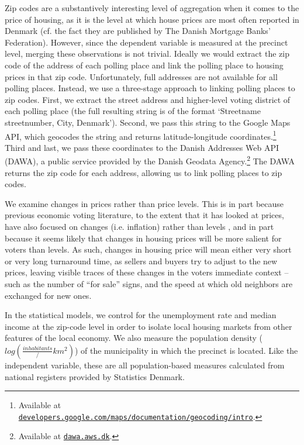 \documentclass[12pt,a4paper]{article}
\begin{document}
	Zip codes are a substantively interesting level of aggregation when it comes to the price of housing, as it is the level at which house prices are most often reported in Denmark (cf. the fact they are published by The Danish Mortgage Banks' Federation). However, since the dependent variable is measured at the precinct level, merging these observations is not trivial. Ideally we would extract the zip code of the address of each polling place and link the polling place to housing prices in that zip code. Unfortunately, full addresses are not available for all polling places. Instead, we use a three-stage approach to linking polling places to zip codes. First, we extract the street address and higher-level voting district of each polling place (the full resulting string is of the format `Streetname streetnumber, City, Denmark'). Second, we pass this string to the Google Maps API, which geocodes the string and returns latitude-longitude coordinates.\footnote{Available at \texttt{\href{https://developers.google.com/maps/documentation/geocoding/intro}{developers.google.com/maps/documentation/geocoding/intro}}.} Third and last, we pass these coordinates to the Danish Addresses Web API (DAWA), a public service provided by the Danish Geodata Agency.\footnote{Available at \texttt{\href{http://dawa.aws.dk/}{dawa.aws.dk}}.} The DAWA returns the zip code for each address, allowing us to link polling places to zip codes. %
	
	We examine changes in prices rather than price levels. This is in part because previous economic voting literature, to the extent that it has looked at prices, have also focused on changes (i.e. inflation) rather than levels \citep[cf.][]{kramer1971short}, and in part because it seems likely that changes in housing prices will be more salient for voters than levels. As such, changes in housing price will mean either very short or very long turnaround time, as sellers and buyers try to adjust to the new prices, leaving visible traces of these changes in the voters immediate context -- such as the number of “for sale” signs, and the speed at which old neighbors are exchanged for new ones.
	
	In the statistical models, we control for the unemployment rate and median income at the zip-code level in order to isolate local housing markets from other features of the local economy. We also measure the population density ($log(\frac{inhabitants}/{km^2})$) of the municipality in which the precinct is located. Like the independent variable, these are all population-based measures calculated from national registers provided by Statistics Denmark.
	
\end{document}
